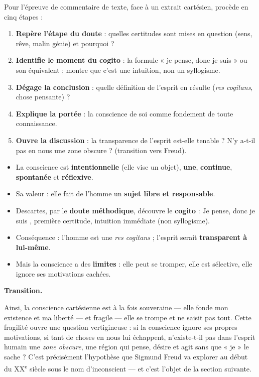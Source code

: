 \documentclass[11pt]{article}
\newcommand{\cle}[1]{{\popxbold\color{popdark}#1}}
\begin{document}
\begin{methode}
Pour l'épreuve de commentaire de texte, face à un extrait cartésien, procède en cinq étapes :
\begin{enumerate}
\item \textbf{Repère l'étape du doute} : quelles certitudes sont mises en question (sens, rêve, malin génie) et pourquoi ?
\item \textbf{Identifie le moment du cogito} : la formule « je pense, donc je suis » ou son équivalent ; montre que c'est une intuition, non un syllogisme.
\item \textbf{Dégage la conclusion} : quelle définition de l'esprit en résulte (\emph{res cogitans}, chose pensante) ?
\item \textbf{Explique la portée} : la conscience de soi comme fondement de toute connaissance.
\item \textbf{Ouvre la discussion} : la transparence de l'esprit est-elle tenable ? N'y a-t-il pas en nous une zone obscure ? (transition vers Freud).
\end{enumerate}
\end{methode}

\begin{aretenir}
\begin{itemize}
\item La conscience est \textbf{intentionnelle} (elle vise un objet), \textbf{une}, \textbf{continue}, \textbf{spontanée} et \textbf{réflexive}.
\item Sa valeur : elle fait de l'homme un \textbf{sujet libre et responsable}.
\item Descartes, par le \textbf{doute méthodique}, découvre le \textbf{cogito} : \guillemotleft Je pense, donc je suis \guillemotright, première certitude, intuition immédiate (non syllogisme).
\item Conséquence : l'homme est une \emph{res cogitans} ; l'esprit serait \textbf{transparent à lui-même}.
\item Mais la conscience a des \textbf{limites} : elle peut se tromper, elle est sélective, elle ignore ses motivations cachées.
\end{itemize}
\end{aretenir}

\textbf{Transition.}\par
Ainsi, la conscience cartésienne est à la fois souveraine — elle fonde mon existence et ma liberté — et fragile — elle se trompe et ne saisit pas tout. Cette fragilité ouvre une question vertigineuse : si la conscience ignore ses propres motivations, si tant de choses en nous lui échappent, n'existe-t-il pas dans l'esprit humain une \emph{zone obscure}, une région qui pense, désire et agit sans que « je » le sache ? C'est précisément l'hypothèse que Sigmund Freud va explorer au début du XX\textsuperscript{e} siècle sous le nom d'\cle{inconscient} — et c'est l'objet de la section suivante.
\end{document}
